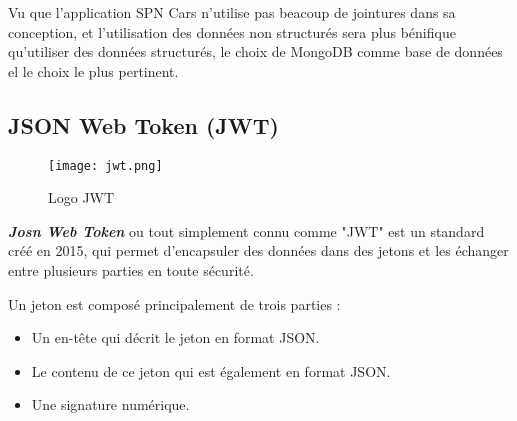 Vu que l'application SPN Cars n'utilise pas beacoup de jointures dans sa conception, et l'utilisation des données non structurés sera plus bénifique qu'utiliser des données structurés, le choix de MongoDB comme base de données el le choix le plus pertinent.

\subsection{JSON Web Token (JWT)}
\begin{figure}[H]
    \centering
    \texttt{[image: jwt.png]}
    \vspace{1cm}
    \captionsetup{justification=centering}
    \caption{Logo JWT}
    \label{fig:jwt_logo}
\end{figure}
\textbf{\textit{Josn Web Token}} ou tout simplement connu comme "JWT" est un standard créé en 2015, qui permet d'encapsuler des données dans des jetons et les échanger entre plusieurs parties en toute sécurité.

Un jeton est composé principalement de trois parties :
\begin{itemize}
    \item Un en-tête qui décrit le jeton en format JSON.
    \item Le contenu de ce jeton qui est également en format JSON.
    \item Une signature numérique.
\end{itemize}


